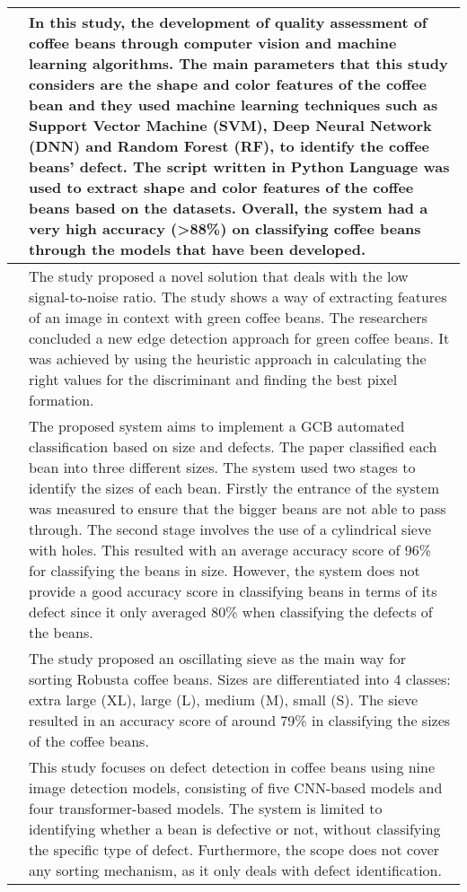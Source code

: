 \begin{center}
\begin{longtable}{| p{4cm} | p{10cm} |}
		\cite{Santos_Rosas_Martins_Araújo_Viana_Gonçalves_2020}
		&
		In this study, the development of quality assessment of coffee beans through computer vision and machine learning algorithms. The main parameters that this study considers are the shape and color features of the coffee bean and they used machine learning techniques such as Support Vector Machine (SVM), Deep Neural Network (DNN) and Random Forest (RF), to identify the coffee beans’ defect. The script written in Python Language was used to extract shape and color features of the coffee beans based on the datasets. Overall, the system had a very high accuracy (>88\%) on classifying coffee beans through the models that have been developed. \\
		\hline

		\cite{Arboleda_Fajardo_Medina_2020}
		&
		The study proposed a novel solution that deals with the low signal-to-noise ratio. The study shows a way of extracting features of an image in context with green coffee beans. The researchers concluded a new edge detection approach for green coffee beans. It was achieved by using the heuristic approach in calculating the right values for the discriminant and finding the best pixel formation.  \\
		\hline

		\cite{Susanibar_Ramirez_Sanchez_Ramirez_2024}
		&
		The proposed system aims to implement a GCB automated classification based on size and defects. The paper classified each bean into three different sizes. The system used two stages to identify the sizes of each bean. Firstly the entrance of the system was measured to ensure that the bigger beans are not able to pass through. The second stage involves the use of a cylindrical sieve with holes. This resulted with an average accuracy score of 96\% for classifying the beans in size. However, the system does not provide a good accuracy score in classifying beans in terms of its defect since it only averaged 80\% when classifying the defects of the beans.  \\
		\hline

		\cite{Srisang_Chanpaka_Chungcharoen_2019}
		&
		The study proposed an oscillating sieve as the main way for sorting Robusta coffee beans. Sizes are differentiated into 4 classes: extra large (XL), large (L), medium (M), small (S).  The sieve resulted in an accuracy score of around 79\% in classifying the sizes of the coffee beans.  \\
		\hline

		\cite{Muchtar_Hafifah_Febriana_Dawood_Ahmadiar_Bahri_Lin_Yohannes_2025}
		&
		This study focuses on defect detection in coffee beans using nine image detection models, consisting of five CNN-based models and four transformer-based models. The system is limited to identifying whether a bean is defective or not, without classifying the specific type of defect. Furthermore, the scope does not cover any sorting mechanism, as it only deals with defect identification. \\
		\hline

	\end{longtable}
\end{center}

